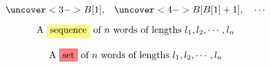 \begin{frame}{}
  

  \[
    \uncover<3->{B[1],} \quad \uncover<4->{B[B[1] + 1], \quad \cdots}
  \]
\end{frame}

\begin{frame}{}
  \[
    \text{A \hl{yellow}{sequence} of $n$ words of lengths } l_1, l_2, \cdots, l_n
  \]

  \pause
  \[
    \text{A \hl{red}{set} of $n$ words of lengths } l_1, l_2, \cdots, l_n
  \]

  \pause
  \vspace{0.30cm}
  \begin{center}
  \end{center}

  \pause
\end{frame}
